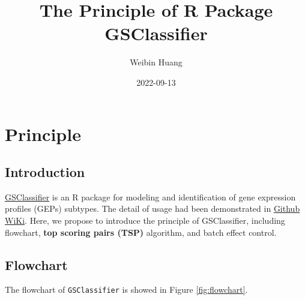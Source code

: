 \documentclass[
]{book}
\title{The Principle of R Package GSClassifier}
\author{Weibin Huang}
\date{2022-09-13}
\begin{document}
\maketitle

{
\setcounter{tocdepth}{2}
\tableofcontents
}
\hypertarget{principle}{%
\chapter{Principle}\label{principle}}

\hypertarget{introduction}{%
\section{Introduction}\label{introduction}}

\href{https://github.com/huangwb8/GSClassifier}{GSClassifier} is an R package for modeling and identification of gene expression profiles (GEPs) subtypes. The detail of usage had been demonstrated in \href{https://github.com/huangwb8/GSClassifier/wiki}{Github WiKi}. Here, we propose to introduce the principle of GSClassifier, including flowchart, \textbf{top scoring pairs (TSP)} algorithm, and batch effect control.

\hypertarget{flowchart}{%
\section{Flowchart}\label{flowchart}}

The flowchart of \texttt{GSClassifier} is showed in Figure \ref{fig:flowchart}.
\end{document}

